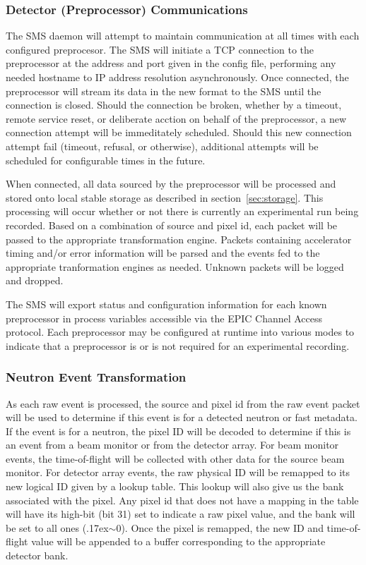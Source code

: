 \subsubsection{Detector (Preprocessor) Communications}

The SMS daemon will attempt to maintain communication at all times with each
configured preprocesor.  The SMS will initiate a TCP connection to the
preprocessor at the address and port given in the config file, performing any
needed hostname to IP address resolution asynchronously. Once connected, the
preprocessor will stream its data in the new format to the SMS until the
connection is closed. Should the connection be broken, whether by a timeout,
remote service reset, or deliberate acction on behalf of the preprocessor, a
new connection attempt will be immeditately scheduled. Should this new
connection attempt fail (timeout, refusal, or otherwise), additional attempts
will be scheduled for configurable times in the future.

When connected, all data sourced by the preprocessor will be processed and
stored onto local stable storage as described in section~\ref{sec:storage}.
This processing will occur whether or not there is currently an experimental
run being recorded. Based on a combination of source and pixel id, each packet
will be passed to the appropriate transformation engine. Packets containing
accelerator timing and/or error information will be parsed and the events fed
to the appropriate tranformation engines as needed. Unknown packets will be
logged and dropped.

The SMS will export status and configuration information for each known
preprocessor in process variables accessible via the EPIC Channel Access
protocol. Each preprocessor may be configured at runtime into various
modes to indicate that a preprocessor is or is not required for an
experimental recording.


\subsubsection{Neutron Event Transformation}

As each raw event is processed, the source and pixel id from the raw
event packet will be used to determine if this event is for a detected neutron
or fast metadata. If the event is for a neutron, the pixel ID will be decoded
to determine if this is an event from a beam monitor or from the detector
array. For beam monitor events, the time-of-flight will be collected with
other data for the source beam monitor. For detector array events, the
raw physical ID will be remapped to its new logical ID
given by a lookup table. This lookup will also give us the bank associated
with the pixel. Any pixel id that does not have a mapping in the table will
have its high-bit (bit 31) set to indicate a raw pixel value, and the bank will
be set to all ones ({\raise.17ex\hbox{$\scriptstyle\sim$}}0).  Once the pixel
is remapped, the new ID and time-of-flight value will be appended to a buffer
corresponding to the appropriate detector bank.

